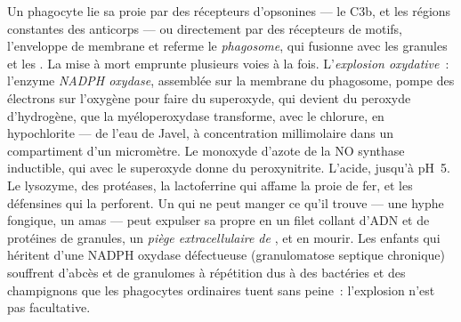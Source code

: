 \begin{definition}\label{def:b3:innate-immunity:killing}
Un phagocyte lie sa proie par des récepteurs d'opsonines --- le C3b, et
les régions constantes des anticorps --- ou directement par des
récepteurs de motifs, l'enveloppe de membrane et referme le
\emph{phagosome}, qui fusionne avec les granules et les . La
mise à mort emprunte plusieurs voies à la fois. L'\emph{explosion
oxydative}~: l'enzyme \emph{NADPH oxydase}, assemblée sur la membrane du
phagosome, pompe des électrons sur l'oxygène pour faire du superoxyde,
qui devient du peroxyde d'hydrogène, que la myéloperoxydase transforme,
avec le chlorure, en hypochlorite --- de l'eau de Javel, à concentration
millimolaire dans un compartiment d'un micromètre. Le monoxyde d'azote
de la NO synthase inductible, qui avec le superoxyde donne du
peroxynitrite. L'acide, jusqu'à pH~5. Le lysozyme, des protéases, la
lactoferrine qui affame la proie de fer, et les défensines qui la
perforent. Un  qui ne peut manger ce qu'il trouve --- une
hyphe fongique, un amas --- peut expulser sa propre  en un
filet collant d'ADN et de protéines de granules, un \emph{piège
extracellulaire de }, et en mourir. Les enfants qui héritent
d'une NADPH oxydase défectueuse (granulomatose septique chronique)
souffrent d'abcès et de granulomes à répétition dus à des bactéries et
des champignons que les phagocytes ordinaires tuent sans peine~:
l'explosion n'est pas facultative.
\end{definition}

